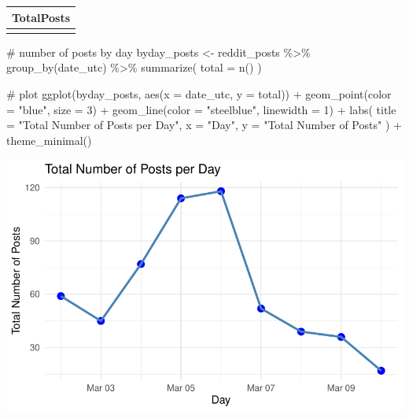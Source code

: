 \documentclass[
  letterpaper,
  DIV=11,
  numbers=noendperiod]{scrartcl}
\newenvironment{Shaded}{\begin{snugshade}}{\end{snugshade}}
\newcommand{\AttributeTok}[1]{\textcolor[rgb]{0.40,0.45,0.13}{#1}}
\newcommand{\CommentTok}[1]{\textcolor[rgb]{0.37,0.37,0.37}{#1}}
\newcommand{\DecValTok}[1]{\textcolor[rgb]{0.68,0.00,0.00}{#1}}
\newcommand{\FunctionTok}[1]{\textcolor[rgb]{0.28,0.35,0.67}{#1}}
\newcommand{\NormalTok}[1]{\textcolor[rgb]{0.00,0.23,0.31}{#1}}
\newcommand{\OtherTok}[1]{\textcolor[rgb]{0.00,0.23,0.31}{#1}}
\newcommand{\SpecialCharTok}[1]{\textcolor[rgb]{0.37,0.37,0.37}{#1}}
\newcommand{\StringTok}[1]{\textcolor[rgb]{0.13,0.47,0.30}{#1}}
\begin{document}
\begin{longtable}[]{@{}r@{}}
\toprule\noalign{}
TotalPosts \\
\midrule\noalign{}
\endhead
\bottomrule\noalign{}
\endlastfoot
557 \\
\end{longtable}

\begin{Shaded}
\begin{Highlighting}[]
\CommentTok{\# number of posts by day}
\NormalTok{byday\_posts }\OtherTok{\textless{}{-}}\NormalTok{ reddit\_posts }\SpecialCharTok{\%\textgreater{}\%}
  \FunctionTok{group\_by}\NormalTok{(date\_utc) }\SpecialCharTok{\%\textgreater{}\%}
  \FunctionTok{summarize}\NormalTok{(}
    \AttributeTok{total =} \FunctionTok{n}\NormalTok{()}
\NormalTok{  )}

\CommentTok{\# plot}
\FunctionTok{ggplot}\NormalTok{(byday\_posts, }\FunctionTok{aes}\NormalTok{(}\AttributeTok{x =}\NormalTok{ date\_utc, }\AttributeTok{y =}\NormalTok{ total)) }\SpecialCharTok{+} 
  \FunctionTok{geom\_point}\NormalTok{(}\AttributeTok{color =} \StringTok{"blue"}\NormalTok{, }\AttributeTok{size =} \DecValTok{3}\NormalTok{) }\SpecialCharTok{+}  
  \FunctionTok{geom\_line}\NormalTok{(}\AttributeTok{color =} \StringTok{"steelblue"}\NormalTok{, }\AttributeTok{linewidth =} \DecValTok{1}\NormalTok{) }\SpecialCharTok{+}  
  \FunctionTok{labs}\NormalTok{(}
    \AttributeTok{title =} \StringTok{"Total Number of Posts per Day"}\NormalTok{,}
    \AttributeTok{x =} \StringTok{"Day"}\NormalTok{,}
    \AttributeTok{y =} \StringTok{"Total Number of Posts"}
\NormalTok{  ) }\SpecialCharTok{+}
  \FunctionTok{theme\_minimal}\NormalTok{()}
\end{Highlighting}
\end{Shaded}

\includegraphics{Reddit_eda_files/figure-pdf/unnamed-chunk-5-1.pdf}
\end{document}
